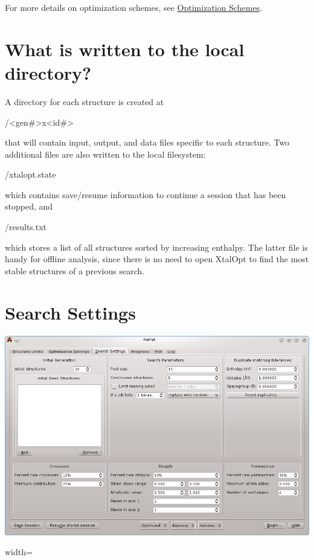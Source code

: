 For more details on optimization schemes, see \hyperlink{optschemes}{Optimization Schemes}.\hypertarget{tut-xo_files}{}\section{What is written to the local directory?}\label{tut-xo_files}
A directory for each structure is created at


\begin{DoxyCode}
/<gen#>x<id#>
\end{DoxyCode}


that will contain input, output, and data files specific to each structure. Two additional files are also written to the local filesystem\-:


\begin{DoxyCode}
/xtalopt.state
\end{DoxyCode}


which contains save/resume information to continue a session that has been stopped, and


\begin{DoxyCode}
/results.txt
\end{DoxyCode}


which stores a list of all structures sorted by increasing enthalpy. The latter file is handy for offline analysis, since there is no need to open Xtal\-Opt to find the most stable structures of a previous search.\hypertarget{tut-xo_search-set}{}\section{Search Settings}\label{tut-xo_search-set}
 
\begin{DoxyImage}
\includegraphics{search-set.png}
\caption{width=}
\end{DoxyImage}


